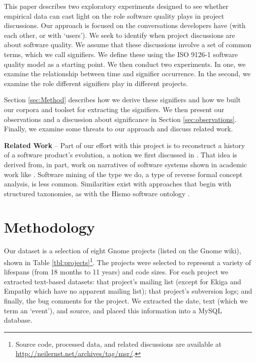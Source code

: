 \documentclass[conference, compsoc]{IEEEtran}
\begin{document}
This paper describes two exploratory experiments designed to see whether empirical data can cast light on the role software quality plays in project discussions. Our approach is focused on the conversations developers have (with each other, or with `users'). We seek to identify when project discussions are about software quality. We assume that these discussions involve a set of common terms, which we call signifiers. We define these using the ISO 9126-1 software quality model \cite{iso9126} as a starting point. We then conduct two experiments. In one, we examine the relationship between time and signifier occurrence. In the second, we examine the role different signifiers play in different projects. 
	
Section \ref{sec:Method} describes how we derive these signifiers and how we built our corpora and toolset for extracting the signifiers. We then present our observations and a discussion about significance in Section \ref{sec:observations}. Finally, we examine some threats to our approach and discuss related work. 

\noindent\textbf{Related Work} -- Part of our effort with this project is to reconstruct a history of a software product's evolution, a notion we first discussed in \cite{Ernst07icsm}. That idea is derived from, in part, work on narratives of software systems shown in academic work like \cite{Anton2001}. %
Software mining of the type we do, a type of reverse formal concept analysis, is less common. Similarities exist with approaches that begin with structured taxonomies, as with the Hismo software ontology \cite{Girba2006}.
	
\vspace{-2mm}
\section{Methodology}
\vspace{-2mm}
\label{sec:Method}
Our dataset is a selection of eight Gnome projects (listed on the Gnome wiki), shown in Table \ref{tbl:projects}\footnote{Source code, processed data, and related discussions are available at \url{http://neilernst.net/archives/tag/msr/}.}. The projects were selected to represent a variety of lifespans (from 18 months to 11 years) and code sizes. For each project we extracted text-based datasets: that project's mailing list (except for Ekiga and Empathy which have no apparent mailing list); that project's subversion logs; and finally, the bug comments for the project. We extracted the date, text (which we term an `event'), and source, and placed this information into a MySQL database.
\end{document}
